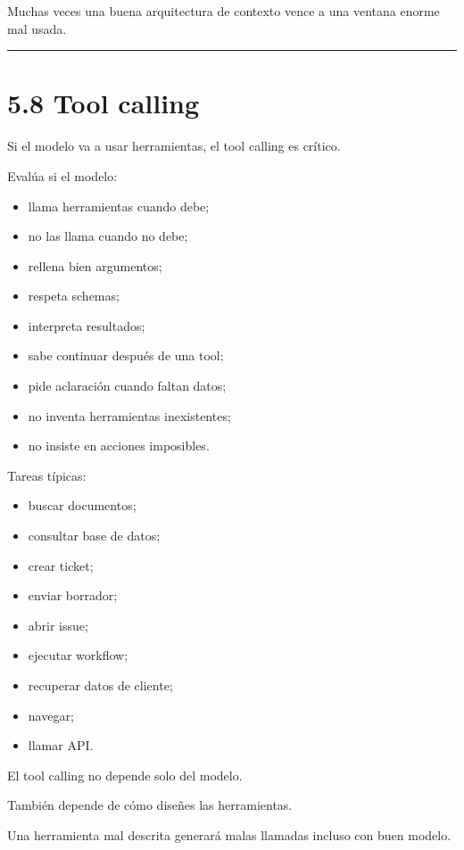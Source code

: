 Muchas veces una buena arquitectura de contexto vence a una ventana
enorme mal usada.

\begin{center}\rule{0.5\linewidth}{0.5pt}\end{center}

\section{5.8 Tool calling}\label{tool-calling-2}

Si el modelo va a usar herramientas, el tool calling es crítico.

Evalúa si el modelo:

\begin{itemize}
\tightlist
\item
  llama herramientas cuando debe;
\item
  no las llama cuando no debe;
\item
  rellena bien argumentos;
\item
  respeta schemas;
\item
  interpreta resultados;
\item
  sabe continuar después de una tool;
\item
  pide aclaración cuando faltan datos;
\item
  no inventa herramientas inexistentes;
\item
  no insiste en acciones imposibles.
\end{itemize}

Tareas típicas:

\begin{itemize}
\tightlist
\item
  buscar documentos;
\item
  consultar base de datos;
\item
  crear ticket;
\item
  enviar borrador;
\item
  abrir issue;
\item
  ejecutar workflow;
\item
  recuperar datos de cliente;
\item
  navegar;
\item
  llamar API.
\end{itemize}

El tool calling no depende solo del modelo.

También depende de cómo diseñes las herramientas.

Una herramienta mal descrita generará malas llamadas incluso con buen
modelo.

